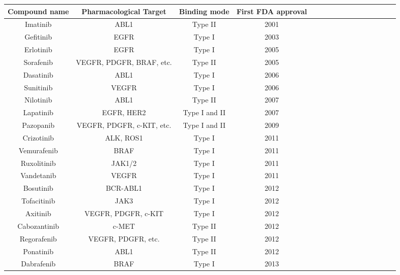 \documentclass[12pt, b5paper,twoside]{tesi_upf}
\newcommand\tr{\rule{0pt}{3.5ex}}
\newcommand\br{\rule[-3ex]{0pt}{3ex}}
\begin{document}
\renewcommand{\arraystretch}{1.2}
\begin{adjustbox}{max width=\textwidth}
\begin{threeparttable}[htbp]

 \centering

 \begin{tabular}{*{4}{|| c | c  |  c | c  ||}} 
 \hline
 \tr\textbf{Compound name}\br &\tr\textbf{Pharmacological Target}\br  & \tr\textbf{Binding mode}\br & \tr\textbf{First FDA approval}\br\\  

\hline
 Imatinib & ABL1 &  Type II   & 2001  \\  
\hline
 Gefitinib & EGFR &  Type I   & 2003  \\  
 \hline
 Erlotinib & EGFR &  Type I   & 2005  \\  
 \hline
 Sorafenib & VEGFR, PDGFR, BRAF, etc. & Type II & 2005  \\  
 \hline
 Dasatinib & ABL1 &  Type I   & 2006  \\ 
 \hline
 Sunitinib & VEGFR &  Type I   & 2006  \\
 \hline
 Nilotinib & ABL1 &  Type II   & 2007  \\ 
 \hline
 Lapatinib & EGFR, HER2 &  Type I and II   & 2007  \\  
  \hline
 Pazopanib & VEGFR, PDGFR, c-KIT, etc.&  Type I and II   & 2009  \\ 
 \hline
 Crizotinib & ALK, ROS1 &  Type I   & 2011  \\ 
 \hline
 Vemurafenib & BRAF &  Type I   & 2011  \\ 
 \hline
 Ruxolitinib & JAK1/2 &  Type I   & 2011  \\  
 \hline
 Vandetanib & VEGFR &  Type I   & 2011  \\ 
  \hline
 Bosutinib & BCR-ABL1 &  Type I   & 2012  \\ 
  \hline
 Tofacitinib & JAK3 &  Type I   & 2012  \\
  \hline
 Axitinib & VEGFR, PDGFR, c-KIT &  Type I   & 2012  \\ 
  \hline
 Cabozantinib & c-MET &  Type II   & 2012  \\  
  \hline
 Regorafenib & VEGFR, PDGFR, etc. &  Type II   & 2012  \\  
  \hline
 Ponatinib & ABL1 &  Type II   & 2012  \\   
  \hline
 Dabrafenib & BRAF &  Type I   & 2013  \\     

\end{tabular}
\end{threeparttable}
\end{adjustbox}
\end{document}

